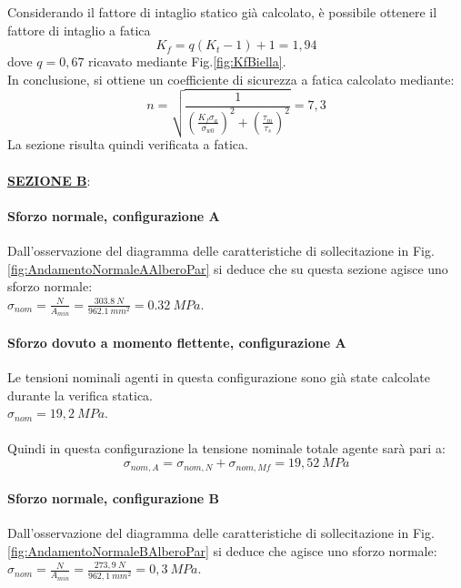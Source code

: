 Considerando il fattore di intaglio statico già calcolato, è possibile ottenere il fattore di intaglio a fatica
\begin{equation}
    K_f=q\left(K_t-1\right)+1=1,94
\end{equation}
dove $q=0,67$ ricavato mediante Fig.\ref{fig:KfBiella}.\\
In conclusione, si ottiene un coefficiente di sicurezza a fatica calcolato mediante:
\begin{equation}
    n=\sqrt{\frac{1}{\left(\frac{K_f\sigma_a}{\sigma_{w0}}\right)^2+\left(\frac{\tau_m}{\tau_s}\right)^2}}=7,3
\end{equation}
La sezione risulta quindi verificata a fatica. \\
\\
\underline{\textbf{SEZIONE B}}:
\paragraph{Sforzo normale, configurazione A} Dall'osservazione del diagramma delle caratteristiche di sollecitazione in Fig.\ref{fig:AndamentoNormaleAAlberoPar} si deduce che su questa sezione agisce uno sforzo normale:\\
$\sigma_{nom}=\frac{N}{A_{min}}=\frac{303.8\ N}{962.1\ mm^2}=0.32\ MPa$.
\paragraph{Sforzo dovuto a momento flettente, configurazione A} Le tensioni nominali agenti in questa configurazione sono già state calcolate durante la verifica statica.\\
$\sigma_{nom}=19,2\ MPa$.\\
\\
Quindi in questa configurazione la tensione nominale totale agente sarà pari a:
\begin{equation}
    \sigma_{nom,A}=\sigma_{nom,N}+\sigma_{nom,Mf}=19,52\ MPa
\end{equation}
\paragraph{Sforzo normale, configurazione B} Dall'osservazione del diagramma delle caratteristiche di sollecitazione in Fig.\ref{fig:AndamentoNormaleBAlberoPar} si deduce che agisce uno sforzo normale:\\
$\sigma_{nom}=\frac{N}{A_{min}}=\frac{273,9\ N}{962,1\ mm^2}=0,3\ MPa$.
